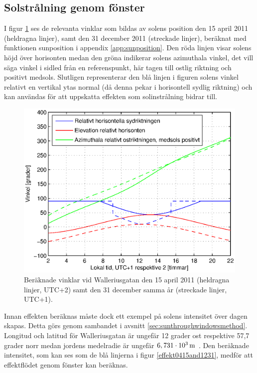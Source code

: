 \subsection{Solstrålning genom fönster}

I figur \ref{fig:sun0415and1231} ses de relevanta vinklar som bildas av solens position den 15 april 2011 (heldragna linjer), samt den 31 december 2011 (streckade linjer), beräknat med funktionen sunposition i appendix \ref{app:sunposition}. Den röda linjen visar solens höjd över horisonten medan den gröna indikerar solens azimuthala vinkel, det vill säga vinkel i sidled från en referenspunkt, här tagen till ostlig riktning och positivt medsols. Slutligen representerar den blå linjen i figuren solens vinkel relativt en vertikal ytas normal (då denna pekar i horisontell sydlig riktning) och kan användas för att uppskatta effekten som solinstrålning bidrar till.

\begin{figure}[hpbt]
\centering
\includegraphics[scale=0.7]{images/sun0415and1231.eps}
\caption{\label{fig:sun0415and1231} Beräknade vinklar vid Walleriusgatan den 15 april 2011 (heldragna linjer, UTC+2) samt den 31 december samma år (streckade linjer, UTC+1).}
\end{figure}

Innan effekten beräknas måste dock ett exempel på solens intensitet över dagen skapas. Detta görs genom sambandet i avsnitt \ref{sec:sunthroughwindowsmethod}. Longitud och latitud för Walleriusgatan är ungefär 12 grader ost respektive 57,7 grader norr medan jordens medelradie är ungefär $\unit[6,731\cdot 10^{3}]{m}$ \cite{physicshandbook}. Den beräknade intensitet, som kan ses som de blå linjerna i figur \ref{effekt0415and1231}, medför att effektflödet genom fönster kan beräknas.

